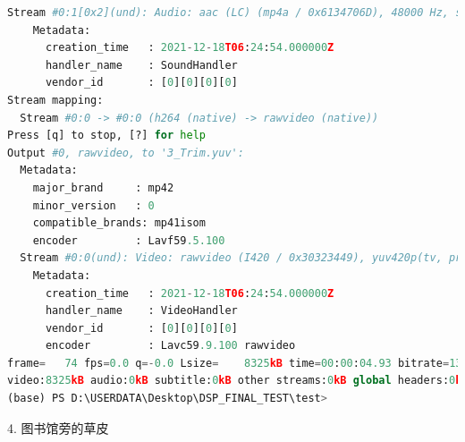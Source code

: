 \documentclass[10pt,UTF8]{ctexart}
\begin{document}
\begin{lstlisting}[language={python}]
  Stream #0:1[0x2](und): Audio: aac (LC) (mp4a / 0x6134706D), 48000 Hz, stereo, fltp, 176 kb/s (default)
    Metadata:
      creation_time   : 2021-12-18T06:24:54.000000Z
      handler_name    : SoundHandler
      vendor_id       : [0][0][0][0]
Stream mapping:
  Stream #0:0 -> #0:0 (h264 (native) -> rawvideo (native))
Press [q] to stop, [?] for help
Output #0, rawvideo, to '3_Trim.yuv':
  Metadata:
    major_brand     : mp42
    minor_version   : 0
    compatible_brands: mp41isom
    encoder         : Lavf59.5.100
  Stream #0:0(und): Video: rawvideo (I420 / 0x30323449), yuv420p(tv, progressive), 320x240 [SAR 17:40 DAR 17:30], q=2-31, 13824 kb/s, 15 fps, 15 tbn (default)
    Metadata:
      creation_time   : 2021-12-18T06:24:54.000000Z
      handler_name    : VideoHandler
      vendor_id       : [0][0][0][0]
      encoder         : Lavc59.9.100 rawvideo
frame=   74 fps=0.0 q=-0.0 Lsize=    8325kB time=00:00:04.93 bitrate=13824.0kbits/s dup=1 drop=69 speed=12.2x
video:8325kB audio:0kB subtitle:0kB other streams:0kB global headers:0kB muxing overhead: 0.000000%
(base) PS D:\USERDATA\Desktop\DSP_FINAL_TEST\test>
\end{lstlisting}

4. 图书馆旁的草皮
\end{document}
